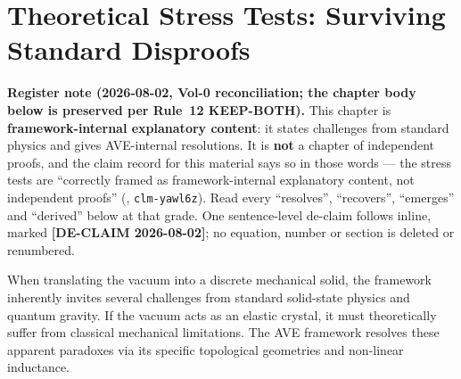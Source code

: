 \chapter{Theoretical Stress Tests: Surviving Standard Disproofs}
\label{ch:resolving_paradoxes}

\noindent\textbf{Register note (2026-08-02, Vol-0 reconciliation; the chapter body below is preserved per Rule~12 KEEP-BOTH).} This chapter is \textbf{framework-internal explanatory content}: it states challenges from standard physics and gives AVE-internal resolutions. It is \textbf{not} a chapter of independent proofs, and the claim record for this material says so in those words --- the stress tests are ``correctly framed as framework-internal explanatory content, not independent proofs'' (, \texttt{clm-yawl6z}). Read every ``resolves'', ``recovers'', ``emerges'' and ``derived'' below at that grade. One sentence-level de-claim follows inline, marked \textbf{[DE-CLAIM 2026-08-02]}; no equation, number or section is deleted or renumbered.

When translating the vacuum into a discrete mechanical solid, the framework inherently invites several challenges from standard solid-state physics and quantum gravity. If the vacuum acts as an elastic crystal, it must theoretically suffer from classical mechanical limitations. The AVE framework resolves these apparent paradoxes via its specific topological geometries and non-linear inductance.

